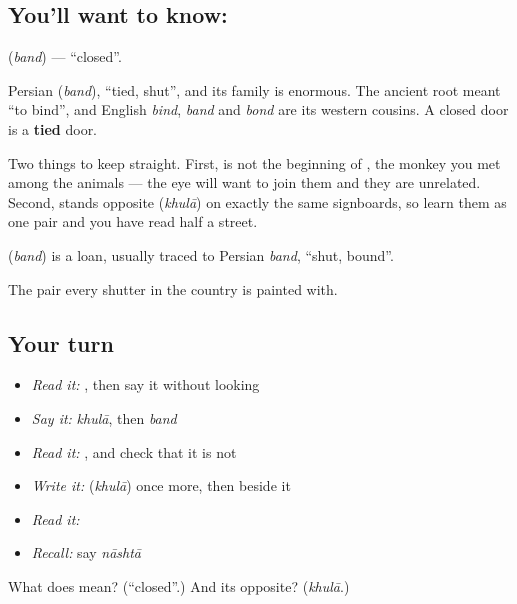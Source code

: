 \subsection*{You'll want to know: }
\textbf{} (\emph{band}) — \textquotedblleft{}closed\textquotedblright{}.

Persian  (\emph{band}), \textquotedblleft{}tied, shut\textquotedblright{}, and its family is enormous. The ancient root meant \textquotedblleft{}to bind\textquotedblright{}, and English \emph{bind}, \emph{band} and \emph{bond} are its western cousins. A closed door is a \textbf{tied} door.

Two things to keep straight. First,  is not the beginning of \textbf{}, the monkey you met among the animals — the eye will want to join them and they are unrelated. Second,  stands opposite \textbf{} (\emph{khulā}) on exactly the same signboards, so learn them as one pair and you have read half a street.

\begin{cousinweb}
\textbf{} (\emph{band}) is a loan, usually traced to Persian \emph{band}, \textquotedblleft{}shut, bound\textquotedblright{}.
\end{cousinweb}

\begin{grammarlens}[title={What you've built}]
The pair every shutter in the country is painted with.
\end{grammarlens}

\subsection*{Your turn}
\begin{itemize}
\raggedright
  \item \emph{Read it:} \textbf{}, then say it without looking
  \item \emph{Say it:} \emph{khulā}, then \emph{band}
  \item \emph{Read it:} , and check that it is not 
  \item \emph{Write it:} \textbf{} (\emph{khulā}) once more, then  beside it
  \item \emph{Read it:} \textbf{}
  \item \emph{Recall:} say \emph{nāshtā}
\end{itemize}

\begin{tcolorbox}[breakable,colback=teal!4,colframe=teal!35!black,title={Before you move on}]
What does  mean? (\textquotedblleft{}closed\textquotedblright{}.) And its opposite? (\emph{khulā}.)
\end{tcolorbox}
